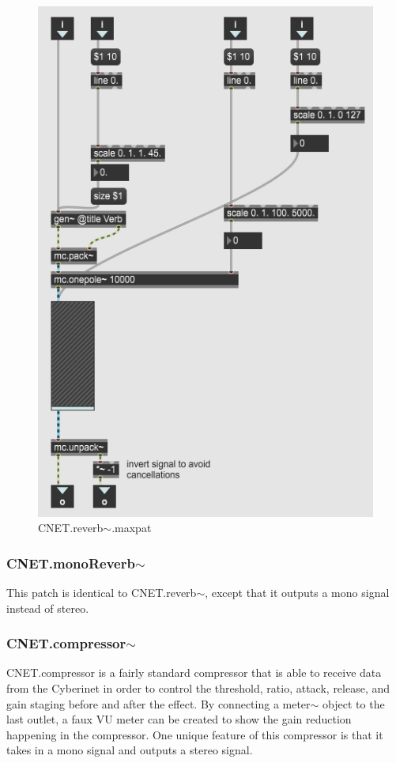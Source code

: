 \begin{figure}
    \centering
    \includegraphics{diagrams/maxPatches/CNET.reverb~.png}
    \caption{CNET.reverb$\sim$.maxpat}
    \label{fig:CNETRev}
\end{figure}

\subsubsection{CNET.monoReverb$\sim$}
This patch is identical to CNET.reverb$\sim$, except that it outputs a mono signal instead of stereo.

\subsubsection{CNET.compressor$\sim$}
CNET.compressor is a fairly standard compressor that is able to receive data from the Cyberinet in order to control the threshold, ratio, attack, release, and gain staging before and after the effect. By connecting a meter$\sim$ object to the last outlet, a faux VU meter can be created to show the gain reduction happening in the compressor. One unique feature of this compressor is that it takes in a mono signal and outputs a stereo signal.

